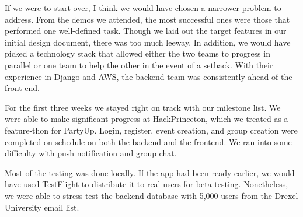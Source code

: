 \documentclass[12pt]{article}
\begin{document}
\bigskip

If we were to start over, I think we would have chosen a narrower problem to address. From the demos we attended, the most successful ones were those that performed one well-defined task. Though we laid out the target features in our initial design document, there was too much leeway. In addition, we would have picked a technology stack that allowed either the two teams to progress in parallel or one team to help the other in the event of a setback. With their experience in Django and AWS, the backend team was consistently ahead of the front end.

\bigskip

For the first three weeks we stayed right on track with our milestone list. We were able to make significant progress at HackPrinceton, which we treated as a feature-thon for PartyUp. Login, register, event creation, and group creation were completed on schedule on both the backend and the frontend. We ran into some difficulty with push notification and group chat. 

\bigskip

Most of the testing was done locally. If the app had been ready earlier, we would have used TestFlight to distribute it to real users for beta testing. Nonetheless, we were able to stress test the backend database with 5,000 users from the Drexel University email list.
\end{document}
